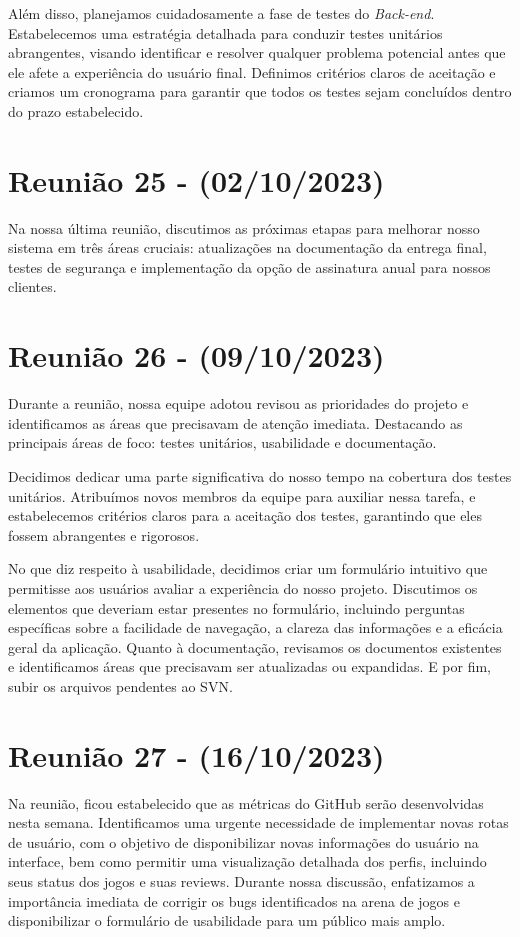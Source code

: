 \begin{apendicesenv}
Além disso, planejamos cuidadosamente a fase de testes do \textit{\gls{Back-end}}. Estabelecemos uma estratégia detalhada para conduzir testes unitários abrangentes, visando identificar e resolver qualquer problema potencial antes que ele afete a experiência do usuário final. Definimos critérios claros de aceitação e criamos um cronograma para garantir que todos os testes sejam concluídos dentro do prazo estabelecido.

\section{Reunião 25 - (02/10/2023)}
Na nossa última reunião, discutimos as próximas etapas para melhorar nosso sistema em três áreas cruciais: atualizações na documentação da entrega final, testes de segurança e implementação da opção de assinatura anual para nossos clientes.

\section{Reunião 26 - (09/10/2023)}
Durante a reunião, nossa equipe adotou revisou as prioridades do projeto e identificamos as áreas que precisavam de atenção imediata. Destacando as principais áreas de foco: testes unitários, usabilidade e documentação.

Decidimos dedicar uma parte significativa do nosso tempo na cobertura dos testes unitários. Atribuímos novos membros da equipe para auxiliar nessa tarefa, e estabelecemos critérios claros para a aceitação dos testes, garantindo que eles fossem abrangentes e rigorosos.

No que diz respeito à usabilidade, decidimos criar um formulário intuitivo que permitisse aos usuários avaliar a experiência do nosso projeto. Discutimos os elementos que deveriam estar presentes no formulário, incluindo perguntas específicas sobre a facilidade de navegação, a clareza das informações e a eficácia geral da aplicação. Quanto à documentação, revisamos os documentos existentes e identificamos áreas que precisavam ser atualizadas ou expandidas. E por fim, subir os arquivos pendentes ao SVN.

\section{Reunião 27 - (16/10/2023)}
Na reunião, ficou estabelecido que as métricas do GitHub serão desenvolvidas nesta semana. Identificamos uma urgente necessidade de implementar novas rotas de usuário, com o objetivo de disponibilizar novas informações do usuário na interface, bem como permitir uma visualização detalhada dos perfis, incluindo seus status dos jogos e suas reviews. Durante nossa discussão, enfatizamos a importância imediata de corrigir os bugs identificados na arena de jogos e disponibilizar o formulário de usabilidade para um público mais amplo.


\end{apendicesenv}
